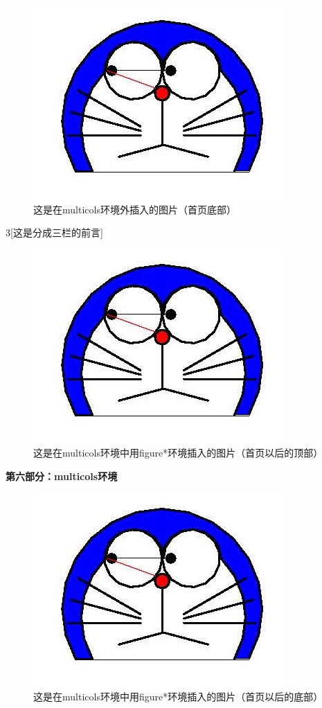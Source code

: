 ﻿\documentclass{article}
\begin{document}
        \begin{figure}[b]
            \includegraphics[width = .1\textwidth]{doraemon1.jpg}
            \caption{这是在multicols环境外插入的图片（首页底部）}
        \end{figure}
\begin{multicols}{3}[\centering 这是分成三栏的前言] 

        \begin{figure}[t]
            \includegraphics[width = .1\textwidth]{doraemon1.jpg}
            \caption{这是在multicols环境中用figure*环境插入的图片（首页以后的顶部）}
        \end{figure}

        \textbf{第六部分：multicols环境}

        \blindtext[2]

        \begin{figure}[b]
            \includegraphics[width = .1\textwidth]{doraemon1.jpg}
            \caption{这是在multicols环境中用figure*环境插入的图片（首页以后的底部）}
        \end{figure}

        \columnbreak

        \mbox{}

        \columnbreak

        \blindtext[2]

\end{multicols}


\blindtext
\end{document}
